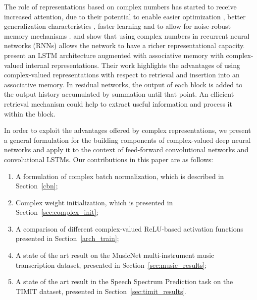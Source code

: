 \documentclass{article}
\begin{document}
The role of representations based on complex numbers has started to receive increased attention, due to their potential to enable easier optimization \citep{nitta2002critical}, better generalization characteristics \citep{hirose2012generalization}, faster learning \citep{arjovsky2015unitary,danihelka2016associative,wisdom2016full} and to allow for noise-robust memory mechanisms \citep{danihelka2016associative}. \citet{wisdom2016full} and \citet{arjovsky2015unitary} show that using complex numbers in recurrent neural networks (RNNs) allows the network to have a richer representational capacity. \citet{danihelka2016associative} present an LSTM \citep{hochreiter1997long} architecture augmented with associative memory with complex-valued internal representations. Their work highlights the advantages of using complex-valued representations with respect to retrieval and insertion into an associative memory. In residual networks, the output of each block is added to the output history accumulated by summation until that point. An efficient retrieval mechanism could help to extract useful information and process it within the block. 

In order to exploit the advantages offered by complex representations, we present a general formulation for the building components of complex-valued deep neural networks and apply it to the context of feed-forward convolutional networks and convolutional LSTMs. Our contributions in this paper are as follows:
\begin{enumerate}
\raggedright
  \item A formulation of complex batch normalization, which is described in Section~\ref{cbn};
  \item Complex weight initialization, which is presented in Section~\ref{sec:complex_init};
  \item A comparison of different complex-valued ReLU-based activation functions presented in Section~\ref{arch_train};
  \item A state of the art result on the MusicNet multi-instrument music transcription
  dataset, presented in Section~\ref{sec:music_results};
  \item A state of the art result in the Speech Spectrum Prediction task on the TIMIT dataset, presented in Section~\ref{sec:timit_results}.
\end{enumerate}
\end{document}
